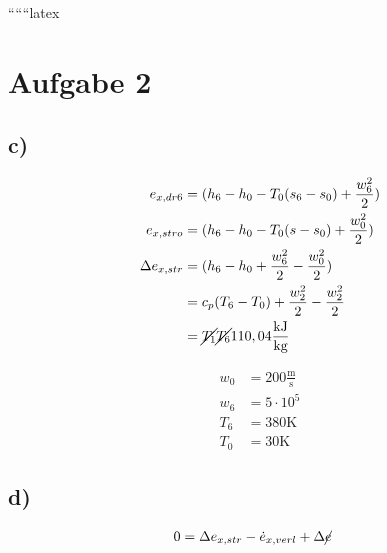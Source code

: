 ``````latex


\section*{Aufgabe 2}

\subsection*{c)}
\begin{align*}
    e_{x,dr6} &= (h_6 - h_0 - T_0 (s_6 - s_0) + \frac{w_6^2}{2}) \\
    e_{x,stro} &= (h_6 - h_0 - T_0 (s - s_0) + \frac{w_0^2}{2}) \\
    \Delta e_{x,str} &= (h_6 - h_0 + \frac{w_6^2}{2} - \frac{w_0^2}{2}) \\
    &= c_p (T_6 - T_0) + \frac{w_2^2}{2} - \frac{w_2^2}{2} \\
    &= \cancel{T_1} \cancel{T_6} 110,04 \frac{\text{kJ}}{\text{kg}}
\end{align*}

\begin{align*}
    w_0 &= 200 \frac{\text{m}}{\text{s}} \\
    w_6 &= 5 \cdot 10^5 \\
    T_6 &= 380 \text{K} \\
    T_0 &= 30 \text{K}
\end{align*}

\subsection*{d)}
\begin{align*}
    0 &= \Delta e_{x,str} - \dot{e}_{x,verl} + \Delta \cancel{e}
\end{align*}

